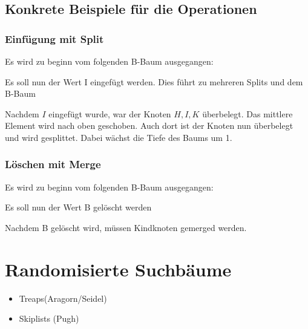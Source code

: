             
        \subsection{Konkrete Beispiele für die Operationen}
            \subsubsection{Einfügung mit Split}
                Es wird zu beginn vom folgenden B-Baum ausgegangen:
                \begin{center}
                    
                \end{center}
                Es soll nun der Wert I eingefügt werden. Dies führt zu mehreren Splits und dem B-Baum
                \begin{center}
                    
                \end{center}
                Nachdem $I$ eingefügt wurde, war der Knoten $H,I,K$ überbelegt. Das mittlere Element wird nach oben geschoben. Auch dort ist der Knoten nun überbelegt und wird gesplittet. Dabei wächst die Tiefe des Baums um 1. 
                
            \subsubsection{Löschen mit Merge}
                Es wird zu beginn vom folgenden B-Baum ausgegangen:
                \begin{center}
                    
                \end{center}
                Es soll nun der Wert B gelöscht werden
                \begin{center}
                    
                \end{center}
                Nachdem B gelöscht wird, müssen Kindknoten gemerged werden.
                

    \section{Randomisierte Suchbäume}
        \begin{itemize}
            \item Treaps(Aragorn/Seidel)
            \item Skiplists (Pugh)
        \end{itemize}
        
